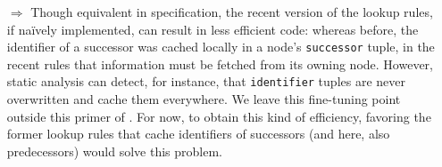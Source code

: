 \documentclass{article}
\begin{document}
\begin{itemize}
\item[$\Longrightarrow$] Though equivalent in specification, the recent
  version of the lookup rules, if na\"{i}vely implemented, can result in
  less efficient code: whereas before, the identifier of a successor was
  cached locally in a node's \lstinline$successor$ tuple, in the recent
  rules that information must be fetched from its owning node.  However,
  static analysis can detect, for instance, that \lstinline$identifier$
  tuples are never overwritten and cache them everywhere. We leave this
  fine-tuning point outside this primer of \ol. For now, to obtain
  this kind of efficiency, favoring the former lookup rules that cache
  identifiers of successors (and here, also predecessors) would solve
  this problem.
\end{itemize}
\end{document}
